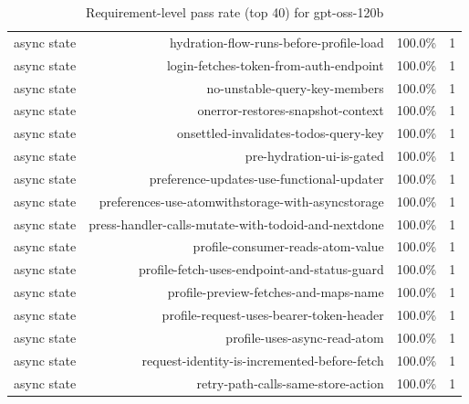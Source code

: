 \begin{table}[htbp]
\begin{tabular}{lrrr}
async state & hydration-flow-runs-before-profile-load & 100.0\% & 1 \\
async state & login-fetches-token-from-auth-endpoint & 100.0\% & 1 \\
async state & no-unstable-query-key-members & 100.0\% & 1 \\
async state & onerror-restores-snapshot-context & 100.0\% & 1 \\
async state & onsettled-invalidates-todos-query-key & 100.0\% & 1 \\
async state & pre-hydration-ui-is-gated & 100.0\% & 1 \\
async state & preference-updates-use-functional-updater & 100.0\% & 1 \\
async state & preferences-use-atomwithstorage-with-asyncstorage & 100.0\% & 1 \\
async state & press-handler-calls-mutate-with-todoid-and-nextdone & 100.0\% & 1 \\
async state & profile-consumer-reads-atom-value & 100.0\% & 1 \\
async state & profile-fetch-uses-endpoint-and-status-guard & 100.0\% & 1 \\
async state & profile-preview-fetches-and-maps-name & 100.0\% & 1 \\
async state & profile-request-uses-bearer-token-header & 100.0\% & 1 \\
async state & profile-uses-async-read-atom & 100.0\% & 1 \\
async state & request-identity-is-incremented-before-fetch & 100.0\% & 1 \\
async state & retry-path-calls-same-store-action & 100.0\% & 1 \\
\bottomrule
\end{tabular}
\caption{Requirement-level pass rate (top 40) for gpt-oss-120b}
\end{table}
